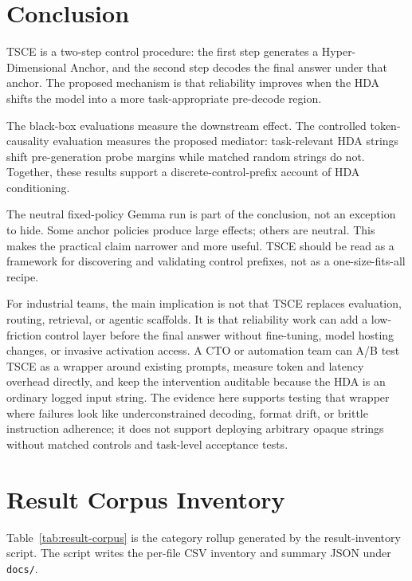 \documentclass[11pt]{article}
\newcommand{\tsce}{\textsc{TSCE}}
\newcommand{\hda}{\textsc{HDA}}
\newcommand{\hdalong}{Hyper-Dimensional Anchor}
\begin{document}
\section{Conclusion}

\tsce{} is a two-step control procedure: the first step generates a \hdalong{}, and the second step decodes the final answer under that anchor. The proposed mechanism is that reliability improves when the \hda{} shifts the model into a more task-appropriate pre-decode region.

The black-box evaluations measure the downstream effect. The controlled token-causality evaluation measures the proposed mediator: task-relevant \hda{} strings shift pre-generation probe margins while matched random strings do not. Together, these results support a discrete-control-prefix account of \hda{} conditioning.

The neutral fixed-policy Gemma run is part of the conclusion, not an exception to hide. Some anchor policies produce large effects; others are neutral. This makes the practical claim narrower and more useful. \tsce{} should be read as a framework for discovering and validating control prefixes, not as a one-size-fits-all recipe.

For industrial teams, the main implication is not that \tsce{} replaces evaluation, routing, retrieval, or agentic scaffolds. It is that reliability work can add a low-friction control layer before the final answer without fine-tuning, model hosting changes, or invasive activation access. A CTO or automation team can A/B test \tsce{} as a wrapper around existing prompts, measure token and latency overhead directly, and keep the intervention auditable because the \hda{} is an ordinary logged input string. The evidence here supports testing that wrapper where failures look like underconstrained decoding, format drift, or brittle instruction adherence; it does not support deploying arbitrary opaque strings without matched controls and task-level acceptance tests.

\appendix

\section{Result Corpus Inventory}
\label{app:result-corpus}

Table~\ref{tab:result-corpus} is the category rollup generated by the result-inventory script. The script writes the per-file CSV inventory and summary JSON under \texttt{docs/}.
\end{document}
